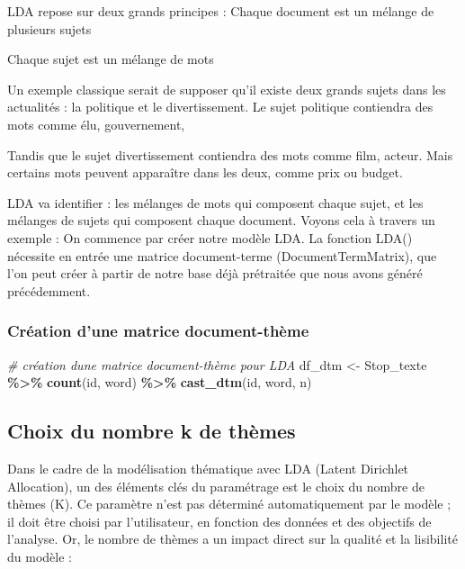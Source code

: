 \documentclass[
]{article}
\newenvironment{Shaded}{\begin{snugshade}}{\end{snugshade}}
\newcommand{\CommentTok}[1]{\textcolor[rgb]{0.56,0.35,0.01}{\textit{#1}}}
\newcommand{\FunctionTok}[1]{\textcolor[rgb]{0.13,0.29,0.53}{\textbf{#1}}}
\newcommand{\NormalTok}[1]{#1}
\newcommand{\OtherTok}[1]{\textcolor[rgb]{0.56,0.35,0.01}{#1}}
\newcommand{\SpecialCharTok}[1]{\textcolor[rgb]{0.81,0.36,0.00}{\textbf{#1}}}
\begin{document}
LDA repose sur deux grands principes : Chaque document est un mélange de
plusieurs sujets

Chaque sujet est un mélange de mots

Un exemple classique serait de supposer qu'il existe deux grands sujets
dans les actualités : la politique et le divertissement. Le sujet
politique contiendra des mots comme élu, gouvernement,

Tandis que le sujet divertissement contiendra des mots comme film,
acteur. Mais certains mots peuvent apparaître dans les deux, comme prix
ou budget.

LDA va identifier : les mélanges de mots qui composent chaque sujet, et
les mélanges de sujets qui composent chaque document. Voyons cela à
travers un exemple : On commence par créer notre modèle LDA. La fonction
LDA() nécessite en entrée une matrice document-terme
(DocumentTermMatrix), que l'on peut créer à partir de notre base déjà
prétraitée que nous avons généré précédemment.

\subsubsection{Création d'une matrice
document-thème}\label{cruxe9ation-dune-matrice-document-thuxe8me}

\begin{Shaded}
\begin{Highlighting}[]
\CommentTok{\# création d\textquotesingle{}une matrice document{-}thème pour LDA}
\NormalTok{df\_dtm }\OtherTok{\textless{}{-}}\NormalTok{ Stop\_texte }\SpecialCharTok{\%\textgreater{}\%}
  \FunctionTok{count}\NormalTok{(id, word) }\SpecialCharTok{\%\textgreater{}\%}              
  \FunctionTok{cast\_dtm}\NormalTok{(id, word, n)  }
\end{Highlighting}
\end{Shaded}

\subsection{Choix du nombre k de
thèmes}\label{choix-du-nombre-k-de-thuxe8mes}

Dans le cadre de la modélisation thématique avec LDA (Latent Dirichlet
Allocation), un des éléments clés du paramétrage est le choix du nombre
de thèmes (K). Ce paramètre n'est pas déterminé automatiquement par le
modèle ; il doit être choisi par l'utilisateur, en fonction des données
et des objectifs de l'analyse. Or, le nombre de thèmes a un impact
direct sur la qualité et la lisibilité du modèle :
\end{document}
